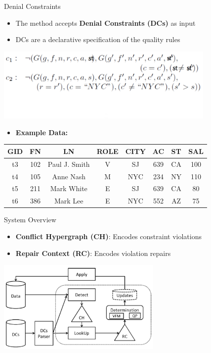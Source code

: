 \documentclass[aspectratio=169]{../latex_main/tntbeamer}  %
\begin{document}
\begin{frame}[c]{Denial Constraints}

\begin{itemize}
    \item The method accepts \textbf{Denial Constraints (DCs)} as input
    \item DCs are a declarative specification of the quality rules
\end{itemize}

\centering\includegraphics[width=0.8\textwidth]{figure/bild19_constraints}

\vspace{-2cm}

\begin{itemize}
    \item \textbf{Example Data:}
    \end{itemize}
    \begin{center}
        \begin{tabular}{|c|c|c|c|c|c|c|c|}
            \hline
            GID & FN & LN & ROLE & CITY & AC & ST & SAL \\
            \hline
            t3 & 102 & Paul J. Smith & V & SJ & 639 & CA & 100 \\
            t4 & 105 & Anne Nash & M & NYC & 234 & NY & 110 \\
            t5 & 211 & Mark White & E & SJ & 639 & CA & 80 \\
            t6 & 386 & Mark Lee & E & NYC & 552 & AZ & 75 \\
            \hline
        \end{tabular}
    \end{center}

\end{frame}

\begin{frame}[c]{System Overview}

\begin{itemize}
    \item \textbf{Conflict Hypergraph (CH)}: Encodes constraint violations
    \item \textbf{Repair Context (RC)}: Encodes violation repairs
\end{itemize}

\centering\includegraphics[width=0.6\textwidth]{figure/bild20_systems}

\end{frame}
\end{document}
